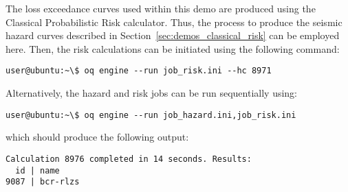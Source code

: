 The loss exceedance curves used within this demo are produced using the
Classical Probabilistic Risk calculator. Thus, the process to produce the
seismic hazard curves described in Section~\ref{sec:demos_classical_risk} can
be employed here. Then, the risk calculations can be initiated using the
following command:

\begin{verbatim}
user@ubuntu:~\$ oq engine --run job_risk.ini --hc 8971
\end{verbatim}

Alternatively, the hazard and risk jobs can be run sequentially using:

\begin{verbatim}
user@ubuntu:~\$ oq engine --run job_hazard.ini,job_risk.ini
\end{verbatim}

which should produce the following output:

\begin{verbatim}
Calculation 8976 completed in 14 seconds. Results:
  id | name
9087 | bcr-rlzs
\end{verbatim}
